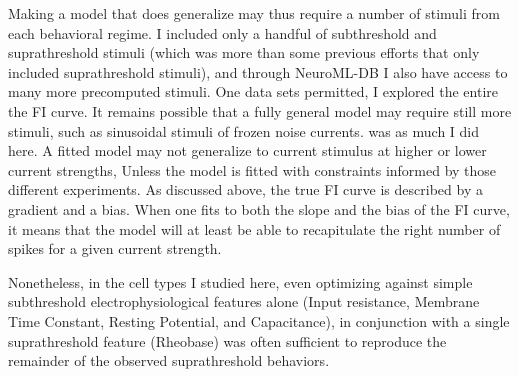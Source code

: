 Making a model that does generalize may thus require a number of stimuli from each behavioral regime.
I included only a handful of subthreshold and suprathreshold stimuli (which was more than some previous efforts that only included suprathreshold stimuli), and through NeuroML-DB I also have access to many more precomputed stimuli.
One data sets permitted, I explored the entire the FI curve.
It remains possible that a fully general model may require still more stimuli, such as sinusoidal stimuli of frozen noise currents.
was as much I did here. A fitted model may not generalize to current stimulus at higher or lower current strengths, Unless the model is fitted with constraints informed by those different experiments. As discussed above, the true FI curve is described by a gradient and a bias. When one fits to both the slope and the bias of the FI curve, it means that the model will at least be able to recapitulate the right number of spikes for  a given current strength. %

%


Nonetheless, in the cell types I studied here, even optimizing against simple subthreshold electrophysiological features alone (Input resistance, Membrane Time Constant, Resting Potential, and Capacitance), in conjunction with a single suprathreshold feature (Rheobase) was often sufficient to reproduce the remainder of the observed suprathreshold behaviors.





